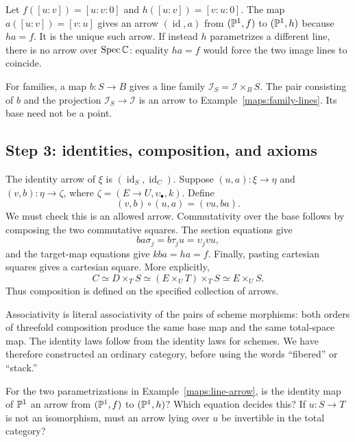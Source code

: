 \begin{Ex}\label{maps:line-arrow}
Let $f([u:v])=[u:v:0]$ and $h([u:v])=[v:u:0]$. The map $a([u:v])=[v:u]$ gives an arrow $(\operatorname{id},a)$ from $(\mathbb P^1,f)$ to $(\mathbb P^1,h)$ because $ha=f$. It is the unique such arrow. If instead $h$ parametrizes a different line, there is no arrow over $\operatorname{Spec}\mathbb C$: equality $ha=f$ would force the two image lines to coincide.

For families, a map $b:S\to B$ gives a line family $\mathcal I_S=\mathcal I\times_B S$. The pair consisting of $b$ and the projection $\mathcal I_S\to\mathcal I$ is an arrow to Example~\ref{maps:family-lines}. Its base need not be a point.
\end{Ex}

\subsection{Step 3: identities, composition, and axioms}

The identity arrow of $\xi$ is $(\operatorname{id}_S,\operatorname{id}_C)$. Suppose $(u,a):\xi\to\eta$ and $(v,b):\eta\to\zeta$, where $\zeta=(E\to U,\upsilon_\bullet,k)$. Define
\[
 (v,b)\circ(u,a)=(vu,ba).
\]
We must check this is an allowed arrow. Commutativity over the base follows by composing the two commutative squares. The section equations give
\[
 ba\sigma_j=b\tau_j u=\upsilon_j vu,
\]
and the target-map equations give $kba=ha=f$. Finally, pasting cartesian squares gives a cartesian square. More explicitly,
\[
 C\simeq D\times_T S\simeq(E\times_U T)\times_T S\simeq E\times_U S.
\]
Thus composition is defined on the specified collection of arrows.

Associativity is literal associativity of the pairs of scheme morphisms: both orders of threefold composition produce the same base map and the same total-space map. The identity laws follow from the identity laws for schemes. We have therefore constructed an ordinary category, before using the words ``fibered'' or ``stack.''

\begin{Ej}\label{maps:ex-arrow}
For the two parametrizations in Example~\ref{maps:line-arrow}, is the identity map of $\mathbb P^1$ an arrow from $(\mathbb P^1,f)$ to $(\mathbb P^1,h)$? Which equation decides this? If $u:S\to T$ is not an isomorphism, must an arrow lying over $u$ be invertible in the total category?
\end{Ej}

